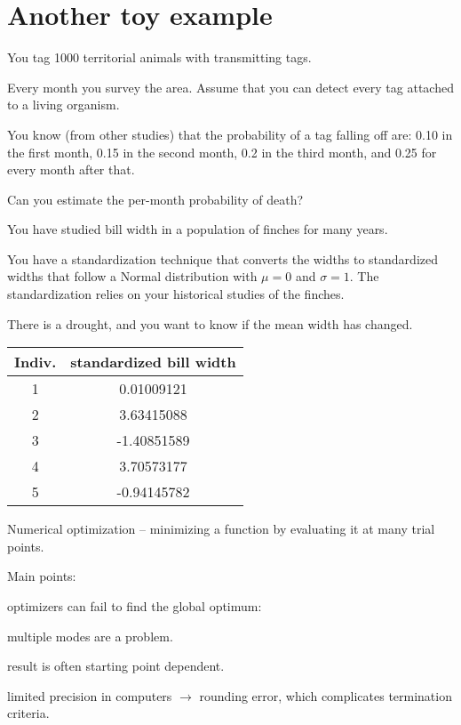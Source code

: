 \documentclass[landscape]{foils}
\begin{document}
\unitlength=1mm



\myNewSlide
\section*{Another toy example}
You tag 1000 territorial animals with transmitting tags.

Every month you survey the area.
Assume that you can detect every tag attached to a living organism.

You know (from other studies) that the probability of a tag falling off are:
0.10 in the first month, 0.15 in the second month, 0.2 in the third month, and
0.25 for every month after that.

Can you estimate the per-month probability of death?

\myNewSlide
You have studied bill width in a population of finches for many years. 

You have a standardization technique that converts the widths to standardized
widths that follow a Normal distribution with $\mu=0$ and $\sigma=1$. 
The standardization relies on your historical studies of the finches.

There is a drought, and you want to know if the mean width has changed.

\begin{center}
\begin{tabular}{c|c}
Indiv. & standardized bill width \\
\hline
1 & 0.01009121 \\
2 & 3.63415088 \\
3 &-1.40851589 \\
4 & 3.70573177 \\
5 &-0.94145782
\end{tabular}
\end{center}


\myNewSlide
\Large
Numerical optimization -- minimizing a function by evaluating it at many trial points.

Main points:
\begin{compactenum}
  \item optimizers can fail to find the global optimum:
  \begin{compactenum}
    \item multiple modes are a problem.
    \item result is often starting point dependent.
  \end{compactenum}
  \item limited precision in computers $\rightarrow$ rounding error, which complicates termination criteria.
\end{compactenum}
\end{document}
